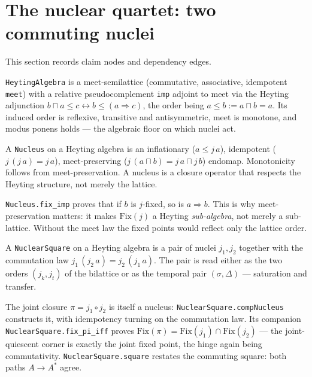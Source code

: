 \section{The nuclear quartet: two commuting nuclei}

This section records claim nodes and dependency edges.

\begin{proposition}\label{thm:heyting}\leanok{}
\texttt{HeytingAlgebra} is a meet-semilattice (commutative, associative, idempotent \texttt{meet}) with a relative pseudocomplement \texttt{imp} adjoint to meet via the Heyting adjunction $b \sqcap a \leq c \leftrightarrow b \leq (a \Rightarrow c)$, the order being $a \leq b := a \sqcap b = a$. Its induced order is reflexive, transitive and antisymmetric, meet is monotone, and modus ponens holds --- the algebraic floor on which nuclei act.
\end{proposition}
\begin{proposition}[Nucleus]\label{thm:nucleus}\leanok{}
A \texttt{Nucleus} on a Heyting algebra is an inflationary ($a \leq j\,a$), idempotent ($j\,(j\,a) = j\,a$), meet-preserving ($j\,(a \sqcap b) = j\,a \sqcap j\,b$) endomap. Monotonicity follows from meet-preservation. A nucleus is a closure operator that respects the Heyting structure, not merely the lattice.
\end{proposition}
\begin{theorem}\label{thm:fix-imp}\leanok{}
\texttt{Nucleus.fix\_imp} proves that if $b$ is $j$-fixed, so is $a \Rightarrow b$. This is why meet-preservation matters: it makes $\mathrm{Fix}(j)$ a Heyting \emph{sub-algebra}, not merely a sub-lattice. Without the meet law the fixed points would reflect only the lattice order.
\end{theorem}
\begin{proposition}\label{thm:nuclear-square}\leanok{}
A \texttt{NuclearSquare} on a Heyting algebra is a pair of nuclei $j_1, j_2$ together with the commutation law $j_1\,(j_2\,a) = j_2\,(j_1\,a)$. The pair is read either as the two orders $(j_k, j_t)$ of the bilattice or as the temporal pair $(\sigma, \Delta)$ --- saturation and transfer.
\end{proposition}
\begin{theorem}\label{thm:nuclear-quartet}\leanok{}
The joint closure $\pi = j_1 \circ j_2$ is itself a nucleus: \texttt{NuclearSquare.compNucleus} constructs it, with idempotency turning on the commutation law. Its companion \texttt{NuclearSquare.fix\_pi\_iff} proves $\mathrm{Fix}(\pi) = \mathrm{Fix}(j_1) \cap \mathrm{Fix}(j_2)$ --- the joint-quiescent corner is exactly the joint fixed point, the hinge again being commutativity. \texttt{NuclearSquare.square} restates the commuting square: both paths $A \to A^{*}$ agree.
\end{theorem}
